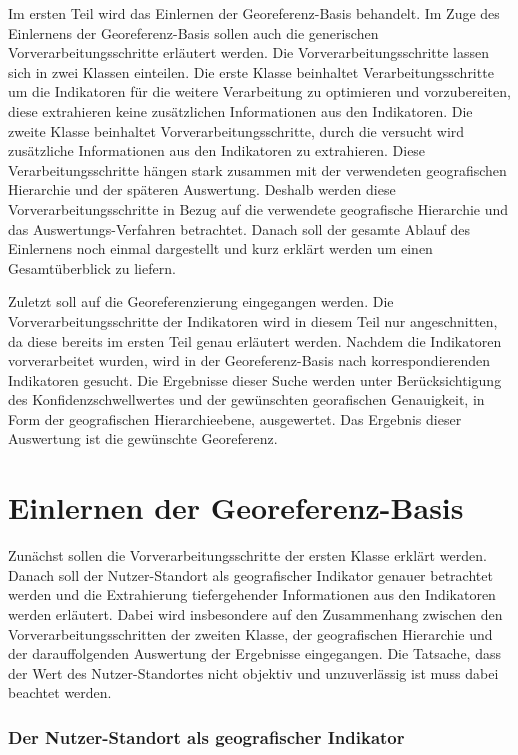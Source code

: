 	Im ersten Teil wird das Einlernen der Georeferenz-Basis behandelt.
	Im Zuge des Einlernens der Georeferenz-Basis sollen auch die generischen Vorverarbeitungsschritte erläutert werden.
	Die Vorverarbeitungsschritte lassen sich in zwei Klassen einteilen.
	Die erste Klasse beinhaltet Verarbeitungsschritte um die Indikatoren für die weitere Verarbeitung zu optimieren und vorzubereiten, diese extrahieren keine zusätzlichen Informationen aus den Indikatoren.
	Die zweite Klasse beinhaltet Vorverarbeitungsschritte, durch die versucht wird zusätzliche Informationen aus den Indikatoren zu extrahieren.
	Diese Verarbeitungsschritte hängen stark zusammen mit der verwendeten geografischen Hierarchie und der späteren Auswertung.
	Deshalb werden diese Vorverarbeitungsschritte in Bezug auf die verwendete geografische Hierarchie und das Auswertungs-Verfahren betrachtet.
	Danach soll der gesamte Ablauf des Einlernens noch einmal dargestellt und kurz erklärt werden um einen Gesamtüberblick zu liefern.
	
	Zuletzt soll auf die Georeferenzierung eingegangen werden.
	Die Vorverarbeitungsschritte der Indikatoren wird in diesem Teil nur angeschnitten, da diese bereits im ersten Teil genau erläutert werden. 
	Nachdem die Indikatoren vorverarbeitet wurden, wird in der Georeferenz-Basis nach korrespondierenden Indikatoren gesucht. 
	Die Ergebnisse dieser Suche werden unter Berücksichtigung des Konfidenzschwellwertes und der gewünschten georafischen Genauigkeit, in Form der geografischen Hierarchieebene, ausgewertet.
	Das Ergebnis dieser Auswertung ist die gewünschte Georeferenz. 


	\section{Einlernen der Georeferenz-Basis}
	Zunächst sollen die Vorverarbeitungsschritte der ersten Klasse erklärt werden.
	Danach soll der Nutzer-Standort als geografischer Indikator genauer betrachtet werden und die Extrahierung tiefergehender Informationen aus den Indikatoren werden erläutert. 
	Dabei wird insbesondere auf den Zusammenhang zwischen den Vorverarbeitungsschritten der zweiten Klasse, der geografischen Hierarchie und der darauffolgenden Auswertung der Ergebnisse eingegangen.   
	Die Tatsache, dass der Wert des Nutzer-Standortes nicht objektiv und unzuverlässig ist muss dabei beachtet werden. 


			\subsubsection{Der Nutzer-Standort als geografischer Indikator}

